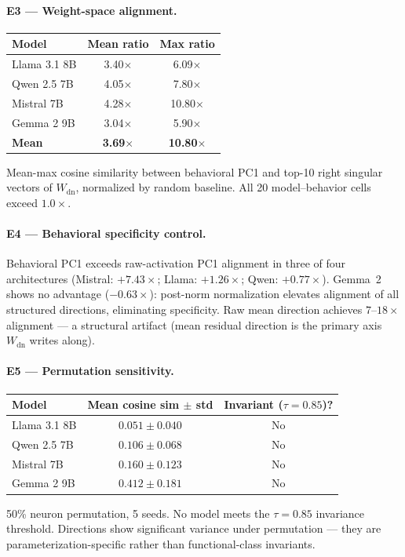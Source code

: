 \documentclass[11pt,a4paper]{article}
\begin{document}
\paragraph{E3 — Weight-space alignment.}
\begin{center}\small
\begin{tabular}{lcc}
\toprule
Model & Mean ratio & Max ratio \\
\midrule
Llama 3.1 8B & 3.40$\times$ & 6.09$\times$ \\
Qwen 2.5 7B  & 4.05$\times$ & 7.80$\times$ \\
Mistral 7B   & 4.28$\times$ & 10.80$\times$ \\
Gemma 2 9B   & 3.04$\times$ & 5.90$\times$ \\
\textbf{Mean} & \textbf{3.69$\times$} & \textbf{10.80$\times$} \\
\bottomrule
\end{tabular}
\end{center}
Mean-max cosine similarity between behavioral PC1 and top-10 right singular
vectors of $W_\mathrm{dn}$, normalized by random baseline.
All 20 model--behavior cells exceed $1.0\times$.

\paragraph{E4 — Behavioral specificity control.}
Behavioral PC1 exceeds raw-activation PC1 alignment in three of four
architectures (Mistral: $+7.43\times$; Llama: $+1.26\times$; Qwen:
$+0.77\times$).
Gemma~2 shows no advantage ($-0.63\times$): post-norm normalization elevates
alignment of all structured directions, eliminating specificity.
Raw mean direction achieves $7$--$18\times$ alignment — a structural artifact
(mean residual direction is the primary axis $W_\mathrm{dn}$ writes along).

\paragraph{E5 — Permutation sensitivity.}
\begin{center}\small
\begin{tabular}{lcc}
\toprule
Model & Mean cosine sim $\pm$ std & Invariant ($\tau{=}0.85$)? \\
\midrule
Llama 3.1 8B & $0.051\pm0.040$ & No \\
Qwen 2.5 7B  & $0.106\pm0.068$ & No \\
Mistral 7B   & $0.160\pm0.123$ & No \\
Gemma 2 9B   & $0.412\pm0.181$ & No \\
\bottomrule
\end{tabular}
\end{center}
50\% neuron permutation, 5 seeds.
No model meets the $\tau{=}0.85$ invariance threshold.
Directions show significant variance under permutation — they are
parameterization-specific rather than functional-class invariants.
\end{document}
